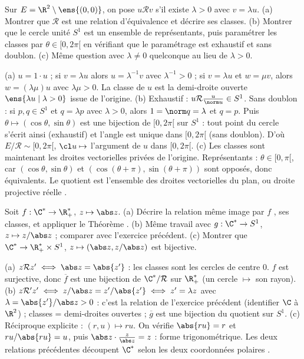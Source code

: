 \begin{exo}
Sur $E=\R^2\setminus\ens{(0,0)}$, on pose $u\mathcal R v$ s'il existe $\lambda>0$ avec $v=\lambda u$.
(a) Montrer que $\mathcal R$ est une relation d'équivalence et décrire ses classes.
(b) Montrer que le cercle unité $S^1$ est un ensemble de représentants, puis paramétrer les classes par $\theta\in[0,2\pi[$ en vérifiant que le paramétrage est exhaustif et sans doublon.
(c) Même question avec $\lambda\neq0$ quelconque au lieu de $\lambda>0$.
\begin{corrige}
(a) $u=1\cdot u$ ; si $v=\lambda u$ alors $u=\lambda^{-1}v$ avec $\lambda^{-1}>0$ ; si $v=\lambda u$ et $w=\mu v$, alors $w=(\lambda\mu)u$ avec $\lambda\mu>0$. La classe de $u$ est la demi-droite ouverte $\ens{\lambda u\mid\lambda>0}$ issue de l'origine.
(b) Exhaustif : $u\mathcal R\frac{u}{\norm u}\in S^1$. Sans doublon : si $p,q\in S^1$ et $q=\lambda p$ avec $\lambda>0$, alors $1=\norm q=\lambda$ et $q=p$. Puis $\theta\mapsto(\cos\theta,\sin\theta)$ est une bijection de $[0,2\pi[$ sur $S^1$ : tout point du cercle s'écrit ainsi (exhaustif) et l'angle est unique dans $[0,2\pi[$ (sans doublon). D'où $E/\mathcal R\sim[0,2\pi[$, $\cl u\mapsto$ l'argument de $u$ dans $[0,2\pi[$.
(c) Les classes sont maintenant les droites vectorielles privées de l'origine. Représentants : $\theta\in[0,\pi[$, car $(\cos\theta,\sin\theta)$ et $(\cos(\theta+\pi),\sin(\theta+\pi))$ sont opposés, donc équivalents. Le quotient est l'ensemble des droites vectorielles du plan, ou \og droite projective réelle \fg.
\end{corrige}
\end{exo}
\begin{exo}
Soit $f:\C^*\to\R_+^*$, $z\mapsto\abs z$.
(a) Décrire la relation \og même image par $f$ \fg, ses classes, et appliquer le Théorème .
(b) Même travail avec $g:\C^*\to S^1$, $z\mapsto z/\abs z$ ; comparer avec l'exercice précédent.
(c) Montrer que $\C^*\to\R_+^*\times S^1$, $z\mapsto(\abs z,z/\abs z)$ est bijective.
\begin{corrige}
(a) $z\mathcal R z'\iff\abs z=\abs{z'}$ : les classes sont les cercles de centre $0$. $f$ est surjective, donc $\overline f$ est une bijection de $\C^*/\mathcal R$ sur $\R_+^*$ (un cercle $\mapsto$ son rayon).
(b) $z\mathcal R'z'\iff z/\abs z=z'/\abs{z'}\iff z'=\lambda z$ avec $\lambda=\abs{z'}/\abs z>0$ : c'est la relation de l'exercice précédent (identifier $\C$ à $\R^2$) ; classes = demi-droites ouvertes ; $\overline g$ est une bijection du quotient sur $S^1$.
(c) Réciproque explicite : $(r,u)\mapsto ru$. On vérifie $\abs{ru}=r$ et $ru/\abs{ru}=u$, puis $\abs z\cdot\frac z{\abs z}=z$ : forme trigonométrique. Les deux relations précédentes découpent $\C^*$ selon les deux coordonnées \og polaires \fg.
\end{corrige}
\end{exo}
